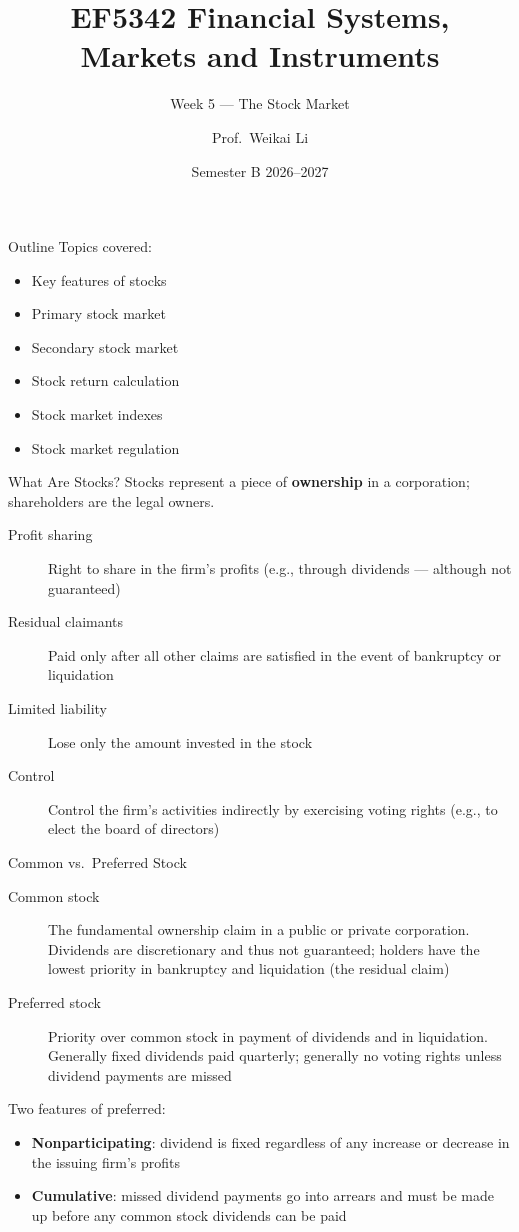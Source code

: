 \documentclass[aspectratio=169]{beamer}
\title{EF5342 Financial Systems, Markets and Instruments}
\subtitle{Week 5 --- The Stock Market}
\author{Prof.\ Weikai Li}
\institute{City University of Hong Kong}
\date{Semester B 2026--2027}
\begin{document}

\begin{frame}
\titlepage
\end{frame}

\begin{frame}{Outline}
Topics covered:
\begin{itemize}
  \item Key features of stocks
  \item Primary stock market
  \item Secondary stock market
  \item Stock return calculation
  \item Stock market indexes
  \item Stock market regulation
\end{itemize}
\end{frame}

\begin{frame}{What Are Stocks?}
Stocks represent a piece of \textbf{ownership} in a corporation; shareholders are the legal owners.
\begin{description}
  \item[Profit sharing] Right to share in the firm's profits (e.g., through dividends --- although not guaranteed)
  \item[Residual claimants] Paid only after all other claims are satisfied in the event of bankruptcy or liquidation
  \item[Limited liability] Lose only the amount invested in the stock
  \item[Control] Control the firm's activities indirectly by exercising voting rights (e.g., to elect the board of directors)
\end{description}
\end{frame}

\begin{frame}{Common vs.\ Preferred Stock}
\begin{description}
  \item[Common stock] The fundamental ownership claim in a public or private corporation. Dividends are discretionary and thus not guaranteed; holders have the lowest priority in bankruptcy and liquidation (the residual claim)
  \item[Preferred stock] Priority over common stock in payment of dividends and in liquidation. Generally fixed dividends paid quarterly; generally no voting rights unless dividend payments are missed
\end{description}
\vspace{0.3em}
Two features of preferred:
\begin{itemize}
  \item \textbf{Nonparticipating}: dividend is fixed regardless of any increase or decrease in the issuing firm's profits
  \item \textbf{Cumulative}: missed dividend payments go into arrears and must be made up before any common stock dividends can be paid
\end{itemize}
\end{frame}
\end{document}
